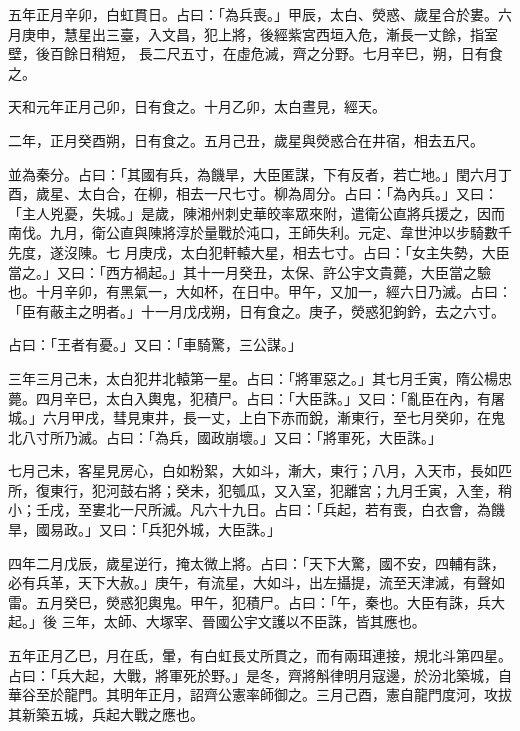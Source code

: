 \begin{pinyinscope}
 五年正月辛卯，白虹貫日。占曰：「為兵喪。」甲辰，太白、熒惑、歲星合於婁。六月庚申，慧星出三臺，入文昌，犯上將，後經紫宮西垣入危，漸長一丈餘，指室壁，後百餘日稍短，
 長二尺五寸，在虛危滅，齊之分野。七月辛巳，朔，日有食之。



 天和元年正月己卯，日有食之。十月乙卯，太白晝見，經天。



 二年，正月癸酉朔，日有食之。五月己丑，歲星與熒惑合在井宿，相去五尺。



 並為秦分。占曰：「其國有兵，為饑旱，大臣匿謀，下有反者，若亡地。」閏六月丁酉，歲星、太白合，在柳，相去一尺七寸。柳為周分。占曰：「為內兵。」又曰：「主人兇憂，失城。」是歲，陳湘州刺史華皎率眾來附，遣衛公直將兵援之，因而南伐。九月，衛公直與陳將淳於量戰於沌口，王師失利。元定、韋世沖以步騎數千先度，遂沒陳。七
 月庚戌，太白犯軒轅大星，相去七寸。占曰：「女主失勢，大臣當之。」又曰：「西方禍起。」其十一月癸丑，太保、許公宇文貴薨，大臣當之驗也。十月辛卯，有黑氣一，大如杯，在日中。甲午，又加一，經六日乃滅。占曰：「臣有蔽主之明者。」十一月戊戌朔，日有食之。庚子，熒惑犯鉤鈐，去之六寸。



 占曰：「王者有憂。」又曰：「車騎驚，三公謀。」



 三年三月己未，太白犯井北轅第一星。占曰：「將軍惡之。」其七月壬寅，隋公楊忠薨。四月辛巳，太白入輿鬼，犯積尸。占曰：「大臣誅。」又曰：「亂臣在內，有屠城。」六月甲戌，彗見東井，長一丈，上白下赤而銳，漸東行，至七月癸卯，在鬼
 北八寸所乃滅。占曰：「為兵，國政崩壞。」又曰：「將軍死，大臣誅。」



 七月己未，客星見房心，白如粉絮，大如斗，漸大，東行；八月，入天市，長如匹所，復東行，犯河鼓右將；癸未，犯瓠瓜，又入室，犯離宮；九月壬寅，入奎，稍小；壬戌，至婁北一尺所滅。凡六十九日。占曰：「兵起，若有喪，白衣會，為饑旱，國易政。」又曰：「兵犯外城，大臣誅。」



 四年二月戊辰，歲星逆行，掩太微上將。占曰：「天下大驚，國不安，四輔有誅，必有兵革，天下大赦。」庚午，有流星，大如斗，出左攝提，流至天津滅，有聲如雷。五月癸巳，熒惑犯輿鬼。甲午，犯積尸。占曰：「午，秦也。大臣有誅，兵大起。」後
 三年，太師、大塚宰、晉國公宇文護以不臣誅，皆其應也。



 五年正月乙巳，月在氐，暈，有白虹長丈所貫之，而有兩珥連接，規北斗第四星。占曰：「兵大起，大戰，將軍死於野。」是冬，齊將斛律明月寇邊，於汾北築城，自華谷至於龍門。其明年正月，詔齊公憲率師御之。三月己酉，憲自龍門度河，攻拔其新築五城，兵起大戰之應也。




\end{pinyinscope}
